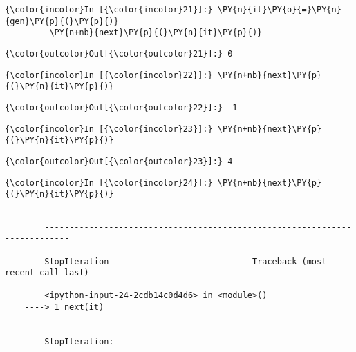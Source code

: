     \begin{Verbatim}[commandchars=\\\{\}]
{\color{incolor}In [{\color{incolor}21}]:} \PY{n}{it}\PY{o}{=}\PY{n}{gen}\PY{p}{(}\PY{p}{)}
         \PY{n+nb}{next}\PY{p}{(}\PY{n}{it}\PY{p}{)}
\end{Verbatim}


\begin{Verbatim}[commandchars=\\\{\}]
{\color{outcolor}Out[{\color{outcolor}21}]:} 0
\end{Verbatim}
            
    \begin{Verbatim}[commandchars=\\\{\}]
{\color{incolor}In [{\color{incolor}22}]:} \PY{n+nb}{next}\PY{p}{(}\PY{n}{it}\PY{p}{)}
\end{Verbatim}


\begin{Verbatim}[commandchars=\\\{\}]
{\color{outcolor}Out[{\color{outcolor}22}]:} -1
\end{Verbatim}
            
    \begin{Verbatim}[commandchars=\\\{\}]
{\color{incolor}In [{\color{incolor}23}]:} \PY{n+nb}{next}\PY{p}{(}\PY{n}{it}\PY{p}{)}
\end{Verbatim}


\begin{Verbatim}[commandchars=\\\{\}]
{\color{outcolor}Out[{\color{outcolor}23}]:} 4
\end{Verbatim}
            
    \begin{Verbatim}[commandchars=\\\{\}]
{\color{incolor}In [{\color{incolor}24}]:} \PY{n+nb}{next}\PY{p}{(}\PY{n}{it}\PY{p}{)}
\end{Verbatim}


    \begin{Verbatim}[commandchars=\\\{\}]

        ---------------------------------------------------------------------------

        StopIteration                             Traceback (most recent call last)

        <ipython-input-24-2cdb14c0d4d6> in <module>()
    ----> 1 next(it)
    

        StopIteration: 

    \end{Verbatim}

